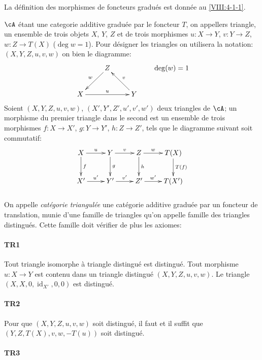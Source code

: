 La définition des morphismes de foncteurs gradués est donnée au 
\ref{VIII:4-1-1}. 

$\cA$ étant une categorie additive graduée par le foncteur $T$, on 
appellers triangle, un ensemble de trois objets $X$, $Y$, $Z$ et de trois 
morphismes $u:X\to Y$, $v:Y\to Z$, $w:Z\to T(X)$ ($\deg w=1$). Pour désigner 
les triangles on utilisera la notation: $(X,Y,Z,u,v,w)$ on bien le diagramme: 
\[\xymatrix{
  & Z \ar[dl]_-w \\
  X \ar[rr]^-u 
    & & Y \ar[lu]_-v 
}\qquad \deg(w)=1
\]
Soient $(X,Y,Z,u,v,w)$, $(X',Y',Z',u',v',w')$ deux triangles de $\cA$; un 
morphisme du premier triangle dans le second est un ensemble de trois 
morphismes $f:X\to X'$, $g:Y\to Y'$, $h:Z\to Z'$, tels que le diagramme 
suivant soit commutatif: 
\[\xymatrix{
  X \ar[r]^-u \ar[d]^-f 
    & Y \ar[r]^-v \ar[d]^-g 
    & Z \ar[r]^-w \ar[d]^-h 
    & T(X) \ar[d]^-{T(f)} \\
  X' \ar[r]^-{u'} 
    & Y' \ar[r]^-{v'} 
    & Z' \ar[r]^-{w'} 
    & T(X') 
}\]





\subsubsection{}\label{VIII:1-1-1}

On appelle \emph{catégorie triangulée} une catégorie additive graduée 
par un foncteur de translation, munie d'une famille de triangles qu'on appelle 
famille des triangles distingués. Cette famille doit vérifier de plus les 
axiomes: 


\paragraph{TR1}
\label{VIII:TR1}

Tout triangle isomorphe à triangle distingué est distingué. Tout 
morphisme $u:X\to Y$ est contenu dans un triangle distingué 
$(X,Y,Z,u,v,w)$. Le triangle $(X,X,0,\operatorname{id}_{X'},0,0)$ est 
distingué. 


\paragraph{TR2}
\label{VIII:TR2}

Pour que $(X,Y,Z,u,v,w)$ soit distingué, il faut et il suffit que 
$(Y,Z,T(X),v,w,-T(u))$ soit distingué. 


\paragraph{TR3}
\label{VIII:TR3}

